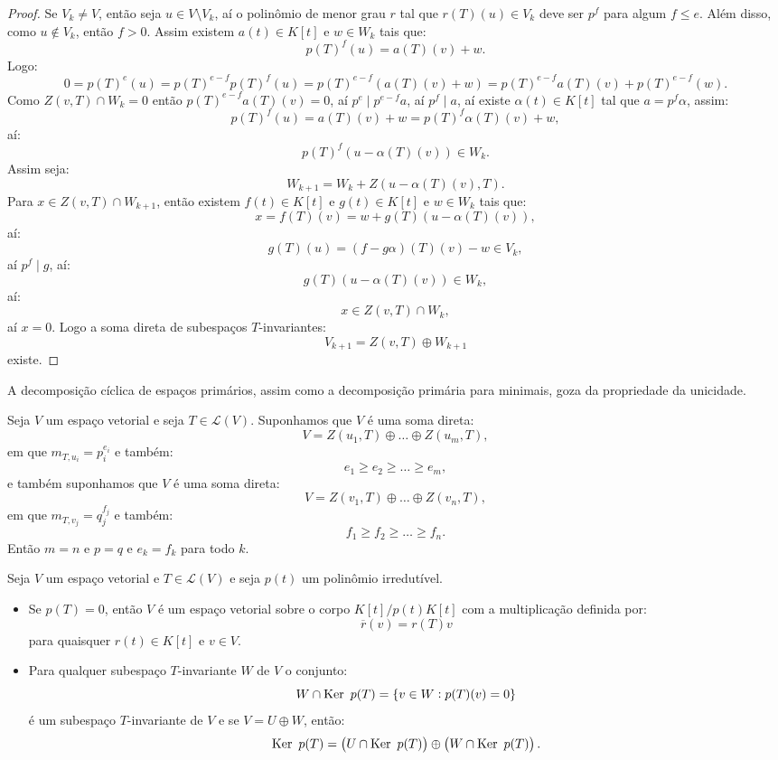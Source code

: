 \documentclass[11pt,twoside,a4paper]{book}
\begin{document}
\begin{proof}
\medskip
\noindent
Se $V_k\neq V$, então seja $u\in V\setminus V_k$, aí o polinômio de menor grau $r$ tal que $r(T)(u)\in V_k$ deve ser $p^f$ para algum $f\leq e$. Além disso, como $u\notin V_k$, então $f>0$. Assim existem $a(t)\in K[t]$ e $w\in W_k$ tais que:
\[
p(T)^f(u)=a(T)(v)+w.
\]
Logo:
\[
0=p(T)^e(u)=p(T)^{e-f}p(T)^f(u)=p(T)^{e-f}(a(T)(v)+w)=p(T)^{e-f}a(T)(v)+p(T)^{e-f}(w).
\]
Como $Z(v,T)\cap W_k=0$ então $p(T)^{e-f}a(T)(v)=0$, aí $p^e\mid p^{e-f}a$, aí $p^f\mid a$, aí existe $\alpha(t)\in K[t]$ tal que $a=p^f\alpha$, assim:
\[
p(T)^f(u)=a(T)(v)+w=p(T)^f\alpha(T)(v)+w,
\]
aí:
\[
p(T)^f(u-\alpha(T)(v))\in W_k.
\]
Assim seja:
\[
W_{k+1}=W_k+Z\left(u-\alpha(T)(v),T\right).
\]
Para $x\in Z(v,T)\cap W_{k+1}$, então existem $f(t)\in K[t]$ e $g(t)\in K[t]$ e $w\in W_k$ tais que:
\[
x=f(T)(v)=w+g(T)(u-\alpha(T)(v)),
\]
aí:
\[
g(T)(u)=(f-g\alpha)(T)(v)-w\in V_k,
\]
aí $p^f\mid g$, aí:
\[
g(T)(u-\alpha(T)(v))\in W_k,
\]
aí:
\[
x\in Z(v,T)\cap W_k,
\]
aí $x=0$. Logo a soma direta de subespaços $T$-invariantes:
\[
V_{k+1}=Z(v,T)\oplus W_{k+1}
\]
existe.
\end{proof}

\noindent
A decomposição cíclica de espaços primários, assim como a decomposição primária para minimais, goza da propriedade da unicidade.

\begin{teorema}
Seja $V$ um espaço vetorial e seja $T\in\mathcal{L}(V)$. Suponhamos que $V$ é uma soma direta:
\[
V=Z(u_1,T)\oplus\dots\oplus Z(u_m,T),
\]
em que $m_{T,u_i}=p_i^{e_i}$ e também:
\[
e_1\geq e_2\geq\dots\geq e_m,
\]
e também suponhamos que $V$ é uma soma direta:
\[
V=Z(v_1,T)\oplus\dots\oplus Z(v_n,T),
\]
em que $m_{T,v_j}=q_j^{f_j}$ e também:
\[
f_1\geq f_2\geq\dots\geq f_n.
\]
Então $m=n$ e $p=q$ e $e_k=f_k$ para todo $k$.
\end{teorema}

\begin{lema}
Seja $V$ um espaço vetorial e $T\in\mathcal{L}(V)$ e seja $p(t)$ um polinômio irredutível.
\begin{itemize}
\item Se $p(T)=0$, então $V$ é um espaço vetorial sobre o corpo $K[t]/p(t)K[t]$ com a
multiplicação definida por:
\[
\overline{r}(v)=r(T)v
\]
para quaisquer $r(t)\in K[t]$ e $v\in V$.
\item Para qualquer subespaço $T$-invariante $W$ de $V$ o conjunto:
\[
W\cap \operatorname{Ker} \ p(T)=\{v\in W:p(T)(v)=0\}
\]
é um subespaço $T$-invariante de $V$ e se $V=U\oplus W$, então:
\[
\Ker \ p(T)=\left(U\cap \Ker \ p(T)\right)\oplus\left(W\cap \Ker \ p(T)\right).
\]
\end{itemize}
\end{lema}
\end{document}
